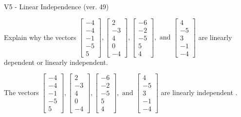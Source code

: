 \begin{exercise}
  \begin{exerciseTitle}V5 - Linear Independence (ver. 49)\end{exerciseTitle}
  \begin{exerciseStatement}
    Explain why the vectors \(\left[\begin{array}{r}
-4 \\
-4 \\
-1 \\
-5 \\
5
\end{array}\right] , \left[\begin{array}{r}
2 \\
-3 \\
4 \\
0 \\
-4
\end{array}\right] , \left[\begin{array}{r}
-6 \\
-2 \\
-5 \\
5 \\
4
\end{array}\right] , \text{ and } \left[\begin{array}{r}
4 \\
-5 \\
3 \\
-1 \\
-4
\end{array}\right]\) are linearly dependent or linearly independent.	


  \end{exerciseStatement}
  \begin{exerciseAnswer}
   The vectors \(\left[\begin{array}{r}
-4 \\
-4 \\
-1 \\
-5 \\
5
\end{array}\right] , \left[\begin{array}{r}
2 \\
-3 \\
4 \\
0 \\
-4
\end{array}\right] , \left[\begin{array}{r}
-6 \\
-2 \\
-5 \\
5 \\
4
\end{array}\right] , \text{ and } \left[\begin{array}{r}
4 \\
-5 \\
3 \\
-1 \\
-4
\end{array}\right]\) are 
  	 linearly independent  .
  


  \end{exerciseAnswer}
\end{exercise}